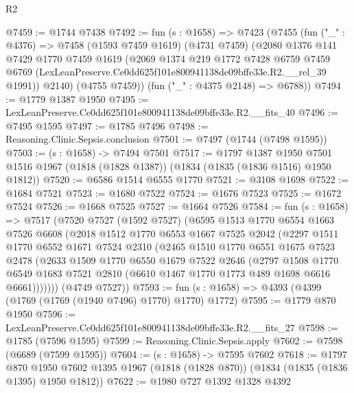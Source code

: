 \begin{lexlean}{R2}
\begin{coremodule}
@7459 := @1744 @7438
@7492 := fun (s : @1658) =>
  @7423
    (@7455
      (fun ("_" : @4376) =>
      @7458
        (@1593 @7459 @1619)
        (@4731 @7459)
        (@2080
          @1376
          @141
          @7429
          @1770
          @7459
          @1619
          (@2069
            @1374
            @219
            @1772
            @7428
            @6759
            @7459
            @6769
            (LexLeanPreserve.Ce0dd625f101e800941138de09bffe33e.R2.__rel_39 @1991))
          @2140)
        (@4755 @7459))
      (fun ("_" : @4375 @2148) => @6788))
@7494 := @1779 @1387 @1950
@7495 := LexLeanPreserve.Ce0dd625f101e800941138de09bffe33e.R2.__fits_40
@7496 := @7495 @1595
@7497 := @1785 @7496
@7498 := Reasoning.Clinic.Sepsis.conclusion
@7501 := @7497 (@1744 (@7498 @1595))
@7503 := (s : @1658) -> @7494 @7501
@7517 := @1797
    @1387
    @1950
    @7501
    @1516
    @1967
    (@1818 (@1828 @1387))
    (@1834 (@1835 (@1836 @1516) @1950 @1812))
@7520 := @6586 @1514 @6555 @1770
@7521 := @3108 @1698
@7522 := @1684 @7521
@7523 := @1680 @7522
@7524 := @1676 @7523
@7525 := @1672 @7524
@7526 := @1668 @7525
@7527 := @1664 @7526
@7584 := fun (s : @1658) =>
  @7517
    (@7520
      @7527
      (@1592 @7527)
      (@6595
        @1513
        @1770
        @6554
        @1663
        @7526
        @6608
        (@2018
          @1512
          @1770
          @6553
          @1667
          @7525
          @2042
          (@2297
            @1511
            @1770
            @6552
            @1671
            @7524
            @2310
            (@2465
              @1510
              @1770
              @6551
              @1675
              @7523
              @2478
              (@2633
                @1509
                @1770
                @6550
                @1679
                @7522
                @2646
                (@2797
                  @1508
                  @1770
                  @6549
                  @1683
                  @7521
                  @2810
                  (@6610 @1467 @1770 @1773 @489 @1698 @6616 @6661)))))))
      (@4749 @7527))
@7593 := fun (s : @1658) => @4393 (@4399 (@1769 (@1769 (@1940 @7496) @1770) @1770) @1772)
@7595 := @1779 @870 @1950
@7596 := LexLeanPreserve.Ce0dd625f101e800941138de09bffe33e.R2.__fits_27
@7598 := @1785 (@7596 @1595)
@7599 := Reasoning.Clinic.Sepsis.apply
@7602 := @7598 (@6689 (@7599 @1595))
@7604 := (s : @1658) -> @7595 @7602
@7618 := @1797
    @870
    @1950
    @7602
    @1395
    @1967
    (@1818 (@1828 @870))
    (@1834 (@1835 (@1836 @1395) @1950 @1812))
@7622 := @1980 @727 @1392 @1328 @4392

\end{coremodule}
\end{lexlean}

